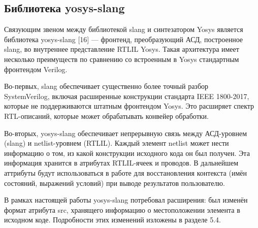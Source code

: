 \subsection{Библиотека yosys-slang}

Связующим звеном между библиотекой slang и синтезатором Yosys является библиотека yosys-slang
[16] --- фронтенд, преобразующий АСД, построенное slang, во внутреннее представление RTLIL Yosys.
Такая архитектура имеет несколько преимуществ по сравнению со встроенным в Yosys стандартным
фронтендом Verilog.

Во-первых, slang обеспечивает существенно более точный разбор \\ SystemVerilog, включая расширенные
конструкции стандарта IEEE 1800-2017, которые не поддерживаются штатным фронтендом Yosys. Это
расширяет спектр RTL-описаний, которые может обрабатывать конвейер обработки.

Во-вторых, yosys-slang обеспечивает непрерывную связь между АСД-уровнем (slang) и netlist-уровнем
(RTLIL). Каждый элемент netlist может нести информацию о том, из какой конструкции исходного кода
он был получен. Эта информация хранится в атрибутах RTLIL-ячеек и проводов. В дальнейшем
аттрибуты будут использоваться в работе для восстановления контекста (имён состояний, выражений
условий) при выводе результатов пользователю.

В рамках настоящей работы yosys-slang потребовал расширения: был изменён формат атрибута src,
хранящего информацию о местоположении элемента в исходном коде. Подробности этих изменений
изложены в разделе 5.4.
